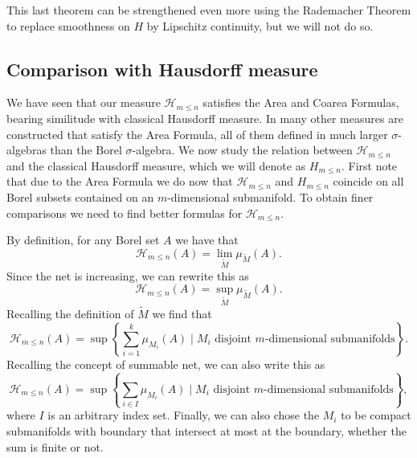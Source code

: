 \documentclass[%
 aip,
 amsmath,amssymb,
 reprint,%
jmp]{revtex4-2}
\begin{document}
This last theorem can be strengthened even more using the Rademacher Theorem to replace smoothness on $H$ by Lipschitz continuity, but we will not do so.

\subsection{Comparison with Hausdorff measure}\label{SubsecComparación}

We have seen that our measure $\mathcal{H}_{m\leq n}$ satisfies the Area and Coarea Formulas, bearing similitude with classical Hausdorff measure. In \cite{Federer} many other measures are constructed that satisfy the Area Formula, all of them defined in much larger $\sigma$-algebras than the Borel $\sigma$-algebra. We now study the relation between $\mathcal{H}_{m\leq n}$ and the classical Hausdorff measure, which we will denote as $H_{m\leq n}$. First note that due to the Area Formula we do now that $\mathcal{H}_{m\leq n}$ and $H_{m\leq n}$ coincide on all Borel subsets contained on an $m$-dimensional submanifold. To obtain finer comparisons we need to find better formulas for $\mathcal{H}_{m\leq n}$.

By definition, for any Borel set $A$ we have that
\begin{equation*}
    \mathcal{H}_{m\leq n}(A) = \lim_{\tilde{M}}\mu_{\tilde{M}}(A).
\end{equation*}
Since the net is increasing, we can rewrite this as
\begin{equation*}
    \mathcal{H}_{m\leq n}(A) = \sup_{\tilde{M}}\mu_{\tilde{M}}(A).
\end{equation*}
Recalling the definition of $\tilde{M}$ we find that
\begin{equation*}
    \mathcal{H}_{m\leq n}(A) = \sup\left\{\sum_{i = 1}^{k}\mu_{M_{i}}(A)\;\bigg|\;M_{i}\text{ disjoint $m$-dimensional submanifolds}\right\}.
\end{equation*}
Recalling the concept of summable net, we can also write this as
\begin{equation*}
    \mathcal{H}_{m\leq n}(A) = \sup\left\{\sum_{i \in I}\mu_{M_{i}}(A)\;\bigg|\;M_{i}\text{ disjoint $m$-dimensional submanifolds}\right\},
\end{equation*}
where $I$ is an arbitrary index set. Finally, we can also chose the $M_{i}$ to be compact submanifolds with boundary that intersect at most at the boundary, whether the sum is finite or not.
\end{document}
